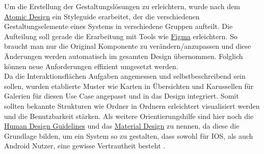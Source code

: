 Um die Erstellung der Gestaltungslösungen zu erleichtern, wurde nach dem \href{https://atomicdesign.bradfrost.com/chapter-2/}{Atomic Design} ein Styleguide erarbeitet, der die verschiedenen Gestaltungselemente eines Systems in verschiedene Gruppen aufteilt.
Die Aufteilung soll gerade die Erarbeitung mit Tools wie \href{https://www.figma.com/}{Figma} erleichtern. So braucht man nur die Original Komponente zu verändern/anzupassen und diese Änderungen werden automatisch im gesamten Design übernommen. Folglich können neue Anforderungen effizient umgesetzt werden. \\

Da die Interaktionsflächen Aufgaben angemessen und selbstbeschreibend sein sollen, wurden etablierte Muster wie Karten in Übersichten und Karussellen für Galerien für diesen Use Case angepasst und in das Design integriert. Somit sollten bekannte Strukturen wie Ordner in Ordnern erleichtert visualisiert werden und die Benutzbarkeit stärken. Als weitere Orientierungshilfe sind hier noch die \href{https://developer.apple.com/design/human-interface-guidelines/}{Human Design Guidelines} \citep{HumanInt45:online} und das \href{https://material.io/design}{Material Design} \citep{DesignMa23:online} zu nennen, da diese die Grundlage bilden, um ein System so zu gestalten, dass sowohl für IOS, als auch Android Nutzer, eine gewisse Vertrautheit besteht \citep{Mitrovic2016ARO}.
\clearpage

